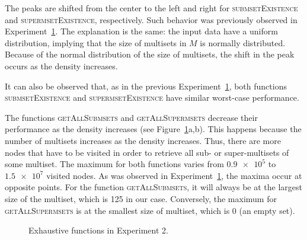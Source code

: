 \documentclass[algorithms,article,accept,pdftex,moreauthors]{Definitions/mdpi}
\begin{document}
The peaks are shifted from the center to the left and right for 
\textsc{submsetExistence} and \textsc{supermsetExistence}, respectively. Such 
behavior was previously observed in Experiment~\hyperref[s:exp1]{1}. The 
explanation is the same: the input data have a uniform distribution, implying that 
the size of multisets in $M$ is normally distributed. Because of the normal 
distribution of the size of multisets, the shift in the peak occurs as the density increases.

It can also be observed that, as in the previous Experiment~\hyperref[s:exp1]{1}, both 
functions \textsc{submsetExistence} and \textsc{supermsetExistence} have similar 
worst-case performance. 

The functions \textsc{getAllSubmsets} and \textsc{getAllSupermsets} decrease 
their performance as the density increases (see Figure~\ref{fig:e2m3}a,b). This happens because the number of multisets increases as 
the density increases. Thus, there are more nodes that have to be visited in order to 
retrieve all sub- or super-multisets of some multiset. The maximum for both functions 
varies from $\num{0.9e5}$ to $\num{1.5e7}$ visited nodes. As was observed in 
Experiment~\hyperref[s:exp1]{1}, the maxima occur at opposite points. For the 
function \textsc{getAllSubmsets}, it will always be at the largest size of the multiset, 
which is 125 in our case. Conversely, the maximum for \textsc{getAllSupermsets} 
is at the smallest size of multiset, which is 0 (an empty set).

\begin{figure}[H]
\caption{Exhaustive functions in Experiment 2.\label{fig:e2m3}}
\end{figure}
\end{document}
